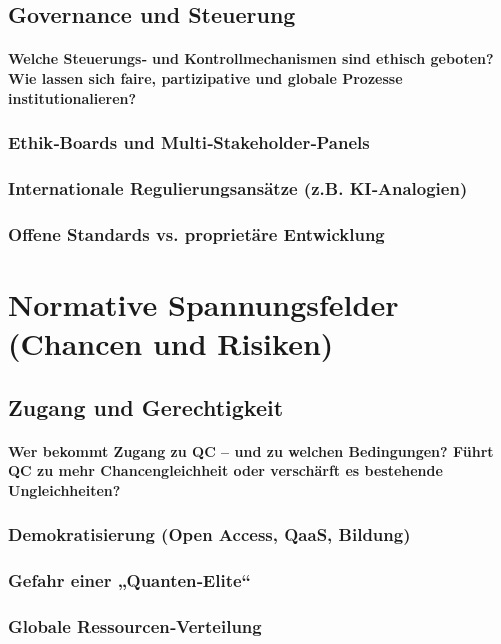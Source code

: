 {\subsection{Governance und Steuerung}
\paragraph{Welche Steuerungs‑ und Kontrollmechanismen sind ethisch geboten? 
Wie lassen sich faire, partizipative und globale Prozesse institutionalieren?
}
\subsubsection{Ethik‑Boards und Multi‑Stakeholder‑Panels}
\subsubsection{Internationale Regulierungsansätze (z.B. KI‑Analogien)}
\subsubsection{Offene Standards vs. proprietäre Entwicklung}

\section{Normative Spannungsfelder (Chancen und Risiken)}

\subsection{Zugang und Gerechtigkeit}
\paragraph{Wer bekommt Zugang zu QC – und zu welchen Bedingungen? 
Führt QC zu mehr Chancengleichheit oder verschärft es bestehende Ungleichheiten?
}

\subsubsection{Demokratisierung (Open Access, QaaS, Bildung)}
\subsubsection{Gefahr einer „Quanten‑Elite“}
\subsubsection{Globale Ressourcen‑Verteilung}

}
